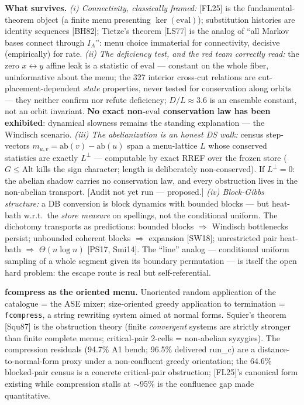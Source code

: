 \documentclass[11pt]{article}
\newcommand{\code}[1]{\texttt{#1}}
\begin{document}
\textbf{What survives.} \emph{(i) Connectivity, classically framed:} [FL25] is the
fundamental-theorem object (a finite menu presenting $\ker(\mathrm{eval})$); substitution histories
are identity sequences [BH82]; Tietze's theorem [LS77] is the analog of ``all Markov bases connect
through $I_A$'': menu choice immaterial for connectivity, decisive (empirically) for rate.
\emph{(ii) The deficiency test, and the red team correctly read:} the zero $x\leftrightarrow y$
affine leak is a statistic of $\mathrm{eval}$ --- constant on the whole fiber, uninformative about
the menu; the 327 interior cross-cut relations are cut-placement-dependent \emph{state} properties,
never tested for conservation along orbits --- they neither confirm nor refute deficiency; $D/L
\approx 3.6$ is an ensemble constant, not an orbit invariant. \textbf{No exact
non-$\mathrm{eval}$ conservation law has been exhibited}: dynamical slowness remains the standing
explanation --- the Windisch scenario. \emph{(iii) The abelianization is an honest DS walk:} census
step-vectors $m_{u,v}=\mathrm{ab}(v)-\mathrm{ab}(u)$ span a menu-lattice $L$ whose conserved
statistics are exactly $L^\perp$ --- computable by exact RREF over the frozen store ($G\le\mathrm{Alt}$
kills the sign character; length is deliberately non-conserved). If $L^\perp=0$: the abelian shadow
carries no conservation law, and every obstruction lives in the non-abelian transport. [Audit not yet
run --- proposed.] \emph{(iv) Block-Gibbs structure:} a DB conversion is block dynamics with bounded
blocks --- but heat-bath w.r.t.\ the \emph{store measure} on spellings, not the conditional uniform.
The dichotomy transports as predictions: bounded blocks $\Rightarrow$ Windisch bottlenecks persist;
unbounded coherent blocks $\Rightarrow$ expansion [SW18]; unrestricted pair heat-bath $\Rightarrow$
$\Theta(n\log n)$ [PS17, Smi14]. The ``line'' analog --- conditional uniform sampling of a whole
segment given its boundary permutation --- is itself the open hard problem: the escape route is real
but self-referential.

\textbf{fcompress as the oriented menu.} Unoriented random application of the catalogue = the ASE
mixer; size-oriented greedy application to termination = \code{fcompress}, a string rewriting system
aimed at normal forms. Squier's theorem [Squ87] is the obstruction theory (finite \emph{convergent}
systems are strictly stronger than finite complete menus; critical-pair 2-cells = non-abelian
syzygies). The compression residuals (94.7\% A1 bench; 96.5\% delivered run\_c) are a distance-to-normal-form
proxy under a non-confluent greedy orientation; the 64.6\% blocked-pair census is a concrete critical-pair
obstruction; [FL25]'s canonical form existing while compression stalls at $\sim$95\% is the
confluence gap made quantitative.
\end{document}
